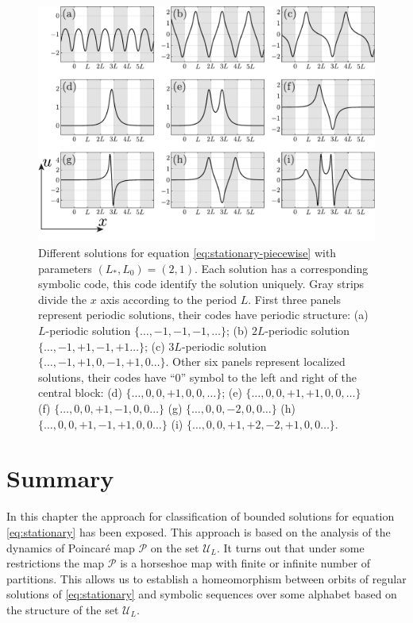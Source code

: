 \pagebreak
\begin{figure}[h]
\centering
	\includegraphics[scale = 1]{pic/solutions for piecewise equation}
	\caption{
		Different solutions for equation \eqref{eq:stationary-piecewise} with parameters $(L_*, L_0) = (2, 1)$.
		Each solution has a corresponding symbolic code, this code identify the solution uniquely.
		Gray strips divide the $x$ axis according to the period $L$.
		First three panels represent periodic solutions, their codes have periodic structure: (a) $L$-periodic solution $\{ \dots, -1, -1, -1, \dots \}$; (b) $2L$-periodic solution $\{ \dots, -1, +1, -1, +1 \dots \}$; (c) $3L$-periodic solution $\{ \dots, -1, +1, 0, -1, +1, 0 \dots \}$.
		Other six panels represent localized solutions, their codes have ``$0$'' symbol to the left and right of the central block: (d) $\{ \dots, 0, 0, +1, 0, 0, \dots \}$; (e) $\{ \dots, 0, 0, +1, +1, 0, 0, \dots \}$ (f) $\{ \dots, 0, 0, +1, -1, 0, 0 \dots \}$ (g) $\{ \dots, 0, 0, -2, 0, 0 \dots \}$ (h) $\{ \dots, 0, 0, +1, -1, +1, 0, 0 \dots \}$ (i) $\{ \dots, 0, 0, +1, +2, -2, +1, 0, 0 \dots \}$.
	}
\label{fig:solutions-piecewise}
\end{figure}

\pagebreak
\section{Summary}

In this chapter the approach for classification of bounded solutions for equation \eqref{eq:stationary} has been exposed.
This approach is based on the analysis of the dynamics of Poincar\'e map $\mathcal{P}$ on the set $\mathscr{U}_L$.
It turns out that under some restrictions the map $\mathcal{P}$ is a horseshoe map with finite or infinite number of partitions.
This allows us to establish a homeomorphism between orbits of regular solutions of \eqref{eq:stationary} and symbolic sequences over some alphabet based on the structure of the set $\mathscr{U}_L$.

